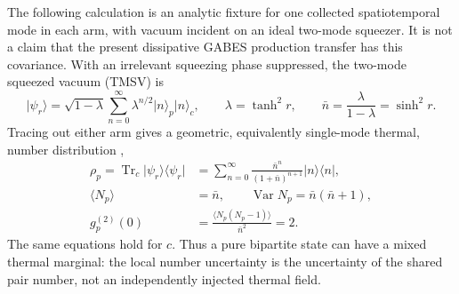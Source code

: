 \documentclass[11pt,a4paper]{article}
\newcommand{\Tr}{\operatorname{Tr}}
\newcommand{\ket}[1]{\lvert #1\rangle}
\newcommand{\ketbra}[2]{\lvert #1\rangle\!\langle #2\rvert}
\begin{document}
The following calculation is an analytic fixture for one collected
spatiotemporal mode in each arm, with vacuum incident on an ideal two-mode
squeezer.  It is not a claim that the present dissipative GABES production
transfer has this covariance.  With an irrelevant squeezing phase suppressed,
the two-mode squeezed vacuum (TMSV) is
\begin{equation}
 \ket{\psi_r}=\sqrt{1-\lambda}\sum_{n=0}^{\infty}
 \lambda^{n/2}\ket{n}_p\ket{n}_c,
 \qquad
 \lambda=\tanh^2r,\qquad
 \bar n=\frac{\lambda}{1-\lambda}=\sinh^2r .
 \label{eq:tmsv-fock}
\end{equation}
Tracing out either arm gives a geometric, equivalently single-mode thermal,
number distribution \cite{Xiang2017},
\begin{equation}
 \begin{aligned}
 \rho_p=\Tr_c\ketbra{\psi_r}{\psi_r}
 &=\sum_{n=0}^{\infty}\frac{\bar n^n}{(1+\bar n)^{n+1}}
 \ketbra{n}{n},\\
 \langle N_p\rangle&=\bar n,\qquad
 \operatorname{Var}N_p=\bar n(\bar n+1),\\
 g_p^{(2)}(0)&=\frac{\langle N_p(N_p-1)\rangle}{\bar n^2}=2 .
 \end{aligned}
 \label{eq:tmsv-marginal}
\end{equation}
The same equations hold for $c$.  Thus a pure bipartite state can have a mixed
thermal marginal: the local number uncertainty is the uncertainty of the
shared pair number, not an independently injected thermal field.
\end{document}
